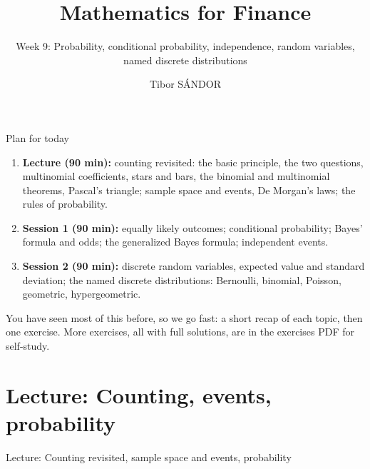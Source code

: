 \documentclass[aspectratio=169,11pt,usepdftitle=false]{beamer}
\title[Mathematics for Finance]{Mathematics for Finance}
\author{Tibor SÁNDOR}
\subtitle{Week 9: Probability, conditional probability, independence,
  random variables, named discrete distributions}
\institute{Corvinus University of Budapest\\[2pt]
  \href{mailto:\myemail}{\texttt{\myemail}}}
\begin{document}
\begin{frame}
  \titlepage
\end{frame}

\begin{frame}{Plan for today}
  \begin{enumerate}
    \item \textbf{Lecture (90 min):} counting revisited: the basic
          principle, the two questions, multinomial coefficients, stars and
          bars, the binomial and multinomial theorems,
          Pascal's triangle; sample space and events, De Morgan's laws;
          the rules of probability.
    \item \textbf{Session 1 (90 min):} equally likely outcomes; conditional
          probability; Bayes' formula and odds; the generalized Bayes
          formula; independent events.
    \item \textbf{Session 2 (90 min):} discrete random variables, expected
          value and standard deviation; the named discrete distributions:
          Bernoulli, binomial, Poisson, geometric, hypergeometric.
  \end{enumerate}
  \vspace{.3cm}
  You have seen most of this before, so we go fast: a short recap of each
  topic, then one exercise. More exercises, all with full solutions, are in
  the exercises PDF for self-study.
\end{frame}

\section{Lecture: Counting, events, probability}

\begin{frame}
  \centering\Large\color{navy}Lecture: Counting revisited, sample space
  and events, probability
\end{frame}
\end{document}
